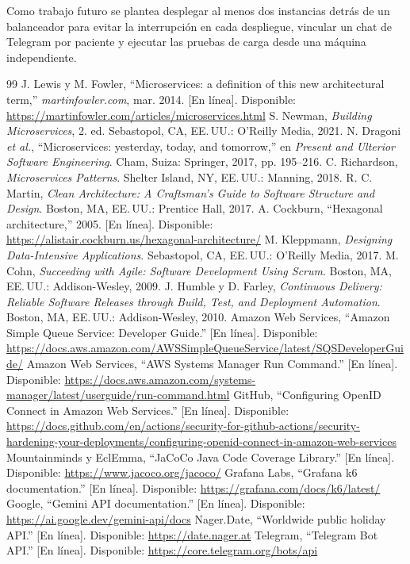 \documentclass[conference]{IEEEtran}
\begin{document}
Como trabajo futuro se plantea desplegar al menos dos instancias detrás de un balanceador para evitar la interrupción en cada despliegue, vincular un chat de Telegram por paciente y ejecutar las pruebas de carga desde una máquina independiente.

\begin{thebibliography}{99}
 J. Lewis y M. Fowler, ``Microservices: a definition of this new architectural term,'' \emph{martinfowler.com}, mar. 2014. [En línea]. Disponible: \url{https://martinfowler.com/articles/microservices.html}
 S. Newman, \emph{Building Microservices}, 2.\textordfeminine{} ed. Sebastopol, CA, EE.\,UU.: O'Reilly Media, 2021.
 N. Dragoni \emph{et al.}, ``Microservices: yesterday, today, and tomorrow,'' en \emph{Present and Ulterior Software Engineering}. Cham, Suiza: Springer, 2017, pp. 195--216.
 C. Richardson, \emph{Microservices Patterns}. Shelter Island, NY, EE.\,UU.: Manning, 2018.
 R. C. Martin, \emph{Clean Architecture: A Craftsman's Guide to Software Structure and Design}. Boston, MA, EE.\,UU.: Prentice Hall, 2017.
 A. Cockburn, ``Hexagonal architecture,'' 2005. [En línea]. Disponible: \url{https://alistair.cockburn.us/hexagonal-architecture/}
 M. Kleppmann, \emph{Designing Data-Intensive Applications}. Sebastopol, CA, EE.\,UU.: O'Reilly Media, 2017.
 M. Cohn, \emph{Succeeding with Agile: Software Development Using Scrum}. Boston, MA, EE.\,UU.: Addison-Wesley, 2009.
 J. Humble y D. Farley, \emph{Continuous Delivery: Reliable Software Releases through Build, Test, and Deployment Automation}. Boston, MA, EE.\,UU.: Addison-Wesley, 2010.
 Amazon Web Services, ``Amazon Simple Queue Service: Developer Guide.'' [En línea]. Disponible: \url{https://docs.aws.amazon.com/AWSSimpleQueueService/latest/SQSDeveloperGuide/}
 Amazon Web Services, ``AWS Systems Manager Run Command.'' [En línea]. Disponible: \url{https://docs.aws.amazon.com/systems-manager/latest/userguide/run-command.html}
 GitHub, ``Configuring OpenID Connect in Amazon Web Services.'' [En línea]. Disponible: \url{https://docs.github.com/en/actions/security-for-github-actions/security-hardening-your-deployments/configuring-openid-connect-in-amazon-web-services}
 Mountainminds y EclEmma, ``JaCoCo Java Code Coverage Library.'' [En línea]. Disponible: \url{https://www.jacoco.org/jacoco/}
 Grafana Labs, ``Grafana k6 documentation.'' [En línea]. Disponible: \url{https://grafana.com/docs/k6/latest/}
 Google, ``Gemini API documentation.'' [En línea]. Disponible: \url{https://ai.google.dev/gemini-api/docs}
 Nager.Date, ``Worldwide public holiday API.'' [En línea]. Disponible: \url{https://date.nager.at}
 Telegram, ``Telegram Bot API.'' [En línea]. Disponible: \url{https://core.telegram.org/bots/api}
\end{thebibliography}
\end{document}
